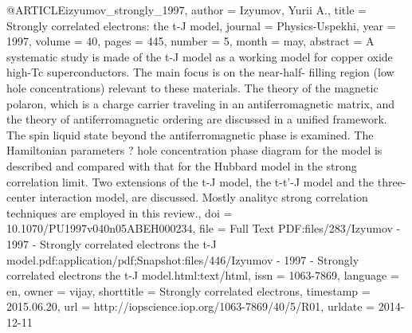 @ARTICLE{izyumov_strongly_1997,
  author = {Izyumov, Yurii A.},
  title = {Strongly correlated electrons: the t-{J} model},
  journal = {Physics-Uspekhi},
  year = {1997},
  volume = {40},
  pages = {445},
  number = {5},
  month = may,
  abstract = {A systematic study is made of the t-J model as a working model for
	copper oxide high-Tc superconductors. The main focus is on the near-half-
	filling region (low hole concentrations) relevant to these materials.
	The theory of the magnetic polaron, which is a charge carrier traveling
	in an antiferromagnetic matrix, and the theory of antiferromagnetic
	ordering are discussed in a unified framework. The spin liquid state
	beyond the antiferromagnetic phase is examined. The Hamiltonian parameters
	? hole concentration phase diagram for the model is described and
	compared with that for the Hubbard model in the strong correlation
	limit. Two extensions of the t-J model, the t-t'-J model and the
	three-center interaction model, are discussed. Mostly analityc strong
	correlation techniques are employed in this review.},
  doi = {10.1070/PU1997v040n05ABEH000234},
  file = {Full Text PDF:files/283/Izyumov - 1997 - Strongly correlated electrons the t-J model.pdf:application/pdf;Snapshot:files/446/Izyumov - 1997 - Strongly correlated electrons the t-J model.html:text/html},
  issn = {1063-7869},
  language = {en},
  owner = {vijay},
  shorttitle = {Strongly correlated electrons},
  timestamp = {2015.06.20},
  url = {http://iopscience.iop.org/1063-7869/40/5/R01},
  urldate = {2014-12-11}
}


